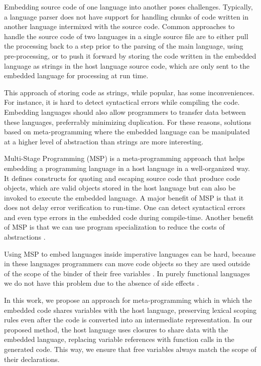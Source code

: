 \documentclass[english]{llncs}
\begin{document}
Embedding source code of one language into another poses challenges.
Typically, a language parser does not have support for handling
chunks of code written in another language intermixed with the source
code. Common approaches to handle the source code of two languages
in a single source file are to either pull the processing back to a
step prior to the parsing of the main language, using pre-processing,
or to push it forward by storing the code written in the embedded
language as strings in the host language source code, which are only
sent to the embedded language for processing at run time.

This approach of storing code as strings, while popular, has some inconveniences.
For instance, it is hard to detect syntactical errors while compiling the code.
Embedding languages should also allow programmers to transfer data
between these languages, preferrably minimizing duplication.
For these reasons, solutions based on meta-programming where the
embedded language can be manipulated at a higher level of abstraction
than strings are more interesting.

Multi-Stage Programming (MSP) \cite{Taha1999MSP,Taha2004gentle,Taha2008gentle}
is a meta-programming approach that helps embedding a programming language in
a host language in a well-organized way.
It defines constructs for quoting and escaping source code
that produce code objects, which are valid objects stored in the host
language but can also be invoked to execute the embedded language.
A major benefit of MSP is that it does not delay error verification to run-time.
One can detect syntactical errors and even type errors in the embedded code
during compile-time.
Another benefit of MSP is that we can use program specialization to
reduce the costs of abstractions \cite{Taha1999MSP}.

Using MSP to embed languages inside imperative languages can be hard,
because in these languages programmers can move code objects so they
are used outside of the scope of the binder of their free variables
\cite{Westbrook2010Mint}.
In purely functional languages we do not have this problem 
due to the absence of side effects \cite{Kameyama2008CSS}.

In this work, we propose an approach for meta-programming which
in which the embedded code shares variables with the
host language, preserving lexical scoping rules even after the code is
converted into an intermediate representation.
In our proposed method, the host language uses closures
to share data with the embedded language, replacing variable references
with function calls in the generated code.
This way, we ensure that free variables always match the scope of their declarations.
\end{document}
